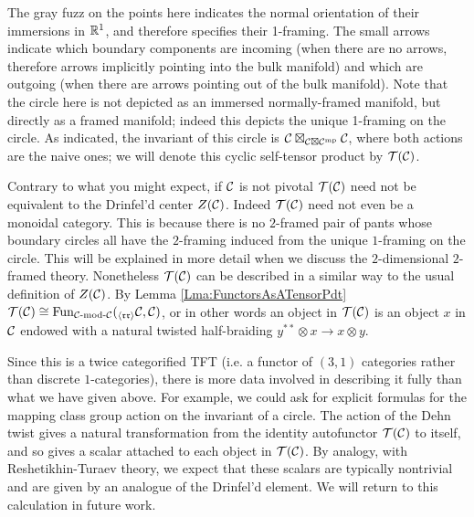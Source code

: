 \documentclass{amsart}
\begin{document}
\nid The gray fuzz on the points here indicates the normal orientation of their immersions in $\mathbb R^1$, and therefore specifies their 1-framing.  The small arrows indicate which boundary components are incoming (when there are no arrows, therefore arrows implicitly pointing into the bulk manifold) and which are outgoing (when there are arrows pointing out of the bulk manifold).    Note that the circle here is not depicted as an immersed normally-framed manifold, but directly as a framed manifold; indeed this depicts the unique 1-framing on the circle.  As indicated, the invariant of this circle is $\mathcal C \boxtimes_{\mathcal C \boxtimes \mathcal C^{\mathrm{mp}}} \mathcal C$, where both actions are the naive ones; we will denote this cyclic self-tensor product by $\mathcal T(\mathcal C)$.

\begin{warning}
Contrary to what you might expect,  if $\mathcal C$ is not pivotal $\mathcal T(\mathcal C)$ need not be equivalent to the Drinfel'd center $Z(\mathcal C)$.  Indeed $\mathcal T(\mathcal C)$ need not even be a monoidal category.  This is because there is no $2$-framed pair of pants whose boundary circles all have the $2$-framing induced from the unique $1$-framing on the circle.  This will be explained in more detail when we discuss the $2$-dimensional $2$-framed theory.  Nonetheless $\mathcal T(\mathcal C)$ can be described in a similar way to the usual definition of $Z(\mathcal C)$.  By Lemma \ref{Lma:FunctorsAsATensorPdt} $\mathcal T(\mathcal C) \cong \operatorname{Fun}_{\mathcal C\text{-mod-}\mathcal C}({}_{\langle\mathfrak{r r}\rangle} {\mathcal C}_{}, \mathcal C)$, or in other words an object in $\mathcal T(\mathcal C)$ is an object $x$ in $\mathcal C$ endowed with a natural twisted half-braiding $y^{**} \otimes x \rightarrow x \otimes y$.
\end{warning}

\begin{remark}
Since this is a twice categorified TFT (i.e. a functor of $(3,1)$ categories rather than discrete $1$-categories), there is more data involved in describing it fully than what we have given above.  For example, we could ask for explicit formulas for the mapping class group action on the invariant of a circle.  The action of the Dehn twist gives a natural transformation from the identity autofunctor $\mathcal T(\mathcal C)$ to itself, and so gives a scalar attached to each object in $\mathcal T(\mathcal C)$.  By analogy, with Reshetikhin-Turaev theory, we expect that these scalars are typically nontrivial and are given by an analogue of the Drinfel'd element.   We will return to this calculation in future work.
\end{remark} 
\end{document}
